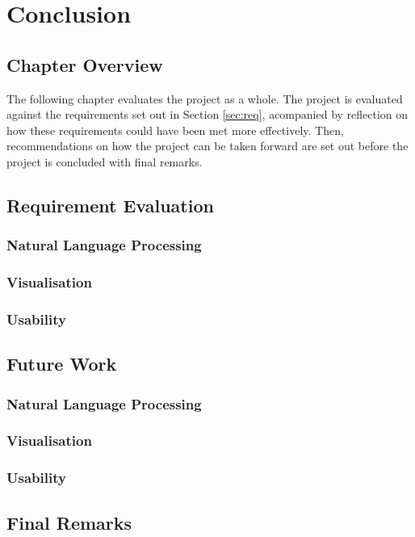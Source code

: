 \chapter{Conclusion}
	\section{Chapter Overview}
		The following chapter evaluates the project as a whole. The project is evaluated against the requirements set out in Section \ref{sec:req}, acompanied by reflection on how these requirements could have been met more effectively. Then, recommendations on how the project can be taken forward are set out before the project is concluded with final remarks.
	\section{Requirement Evaluation}
		\subsection{Natural Language Processing}
		\subsection{Visualisation}
		\subsection{Usability}
	\section{Future Work}
		\subsection{Natural Language Processing}
		\subsection{Visualisation}
		\subsection{Usability}
	\section{Final Remarks}